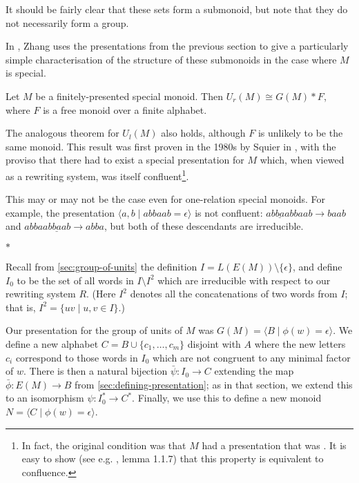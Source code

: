 \documentclass[noindex,noinsetproof,12pt]{lmaths}
\newcommand{\paradec}{\par\begin{center}$\ast$\end{center}}
\begin{document}
It should be fairly clear that these sets form a submonoid, but note that they do not necessarily form a group.

In \cite{Zhang1992a}, Zhang uses the presentations from the previous section to give a particularly simple characterisation of the structure of these submonoids in the case where $M$ is special.
\begin{theorem} \label{thm:gen-units-factor-freely}
	Let $M$ be a finitely-presented special monoid. Then $U_r(M) \cong G(M) \ast F$, where $F$ is a free monoid over a finite alphabet.
\end{theorem}

The analogous theorem for $U_l(M)$ also holds, although $F$ is unlikely to be the same monoid. This result was first proven in the 1980s by Squier in \cite{Squier1987}, with the proviso that there had to exist a special presentation for $M$ which, when viewed as a rewriting system, was itself confluent\footnote{In fact, the original condition was that $M$ had a presentation that was . It is easy to show (see e.g. \cite{Book1993}, lemma 1.1.7) that this property is equivalent to confluence.}.

This may or may not be the case even for one-relation special monoids. For example, the presentation $\langle a, b \mid abbaab = \epsilon\rangle$ is not confluent: $\underline{abbaab}baab \to baab$ and $abba\underline{abbaab} \to abba$, but both of these descendants are irreducible.

\paradec

Recall from \cref{sec:group-of-units} the definition $I = L(E(M)) \setminus \{\epsilon\}$, and define $I_0$ to be the set of all words in $I \setminus I^2$ which are irreducible with respect to our rewriting system $R$. (Here $I^2$ denotes all the concatenations of two words from $I$; that is, $I^2 = \{ uv \mid u, v \in I \}$.)

Our presentation for the group of units of $M$ was $G(M) = \langle B \mid \phi(w) = \epsilon \rangle$. We define a new alphabet $C = B \cup \{c_1, \ldots, c_m\}$ disjoint with $A$ where the new letters $c_i$ correspond to those words in $I_0$ which are not congruent to any minimal factor of $w$. There is then a natural bijection $\bar\psi : I_0 \to C$ extending the map $\bar\phi : E(M) \to B$ from \cref{sec:defining-presentation}; as in that section, we extend this to an isomorphism $\psi : I_0^* \to C^*$. Finally, we use this to define a new monoid $N = \langle C \mid \phi(w) = \epsilon\rangle$.
\end{document}
